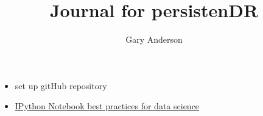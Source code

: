 \documentclass[hyperref]{labbook}
\begin{document}
\frontmatter
\title{Journal for persistenDR}
\author{Gary Anderson }
\maketitle

\tableofcontents



\mainmatter


\begin{itemize}
\item set up gitHub repository
\item \href{https://www.svds.com/jupyter-notebook-best-practices-for-data-science/}{IPython Notebook best practices for data science}
\end{itemize}



\printindex
\end{document}
